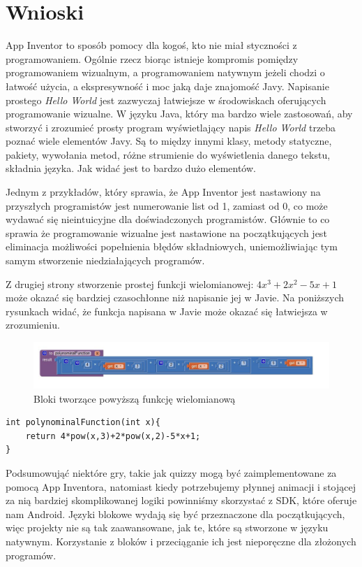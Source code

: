 \chapter{Wnioski}

App Inventor to sposób pomocy dla kogoś, kto nie miał styczności z programowaniem. Ogólnie rzecz biorąc istnieje kompromis pomiędzy programowaniem wizualnym, a programowaniem natywnym jeżeli chodzi o łatwość użycia, a ekspresywność i moc jaką daje znajomość Javy. Napisanie prostego \emph{Hello World} jest zazwyczaj łatwiejsze w środowiskach oferujących programowanie wizualne. W języku Java, który ma bardzo wiele zastosowań, aby stworzyć i zrozumieć prosty program wyświetlający napis \emph{Hello World} trzeba poznać wiele elementów Javy. Są to między innymi klasy, metody statyczne, pakiety, wywołania metod, różne strumienie do wyświetlenia danego tekstu, składnia języka. Jak widać jest to bardzo dużo elementów. 

Jednym z przykładów, który sprawia, że App Inventor jest nastawiony na przyszłych programistów jest numerowanie list od 1, zamiast od 0, co może wydawać się nieintuicyjne dla doświadczonych programistów. Głównie to co sprawia że programowanie wizualne jest nastawione na początkujących jest eliminacja możliwości popełnienia błędów składniowych, uniemożliwiając tym samym stworzenie niedziałających programów. 

Z drugiej strony stworzenie prostej funkcji wielomianowej: $4x^3+2x^2-5x+1$ może okazać się bardziej czasochłonne niż napisanie jej w Javie. 
Na poniższych rysunkach widać, że funkcja napisana w Javie może okazać się łatwiejsza w zrozumieniu.


\begin{figure}[H]
\centering\includegraphics[width=15cm]{figures/polynominalFunction}
\caption{Bloki tworzące powyższą funkcję wielomianową}
\end{figure}

\begin{lstlisting}
int polynominalFunction(int x){
	return 4*pow(x,3)+2*pow(x,2)-5*x+1;
}
\end{lstlisting}


Podsumowująć niektóre gry, takie jak quizzy mogą być zaimplementowane za pomocą App Inventora, natomiast kiedy potrzebujemy płynnej animacji i stojącej za nią bardziej skomplikowanej logiki powinniśmy skorzystać z SDK, które oferuje nam Android. Języki blokowe wydają się być przeznaczone dla początkujących, więc projekty nie są tak zaawansowane, jak te, które są stworzone w języku natywnym. Korzystanie z bloków i przeciąganie ich jest nieporęczne dla złożonych programów.

